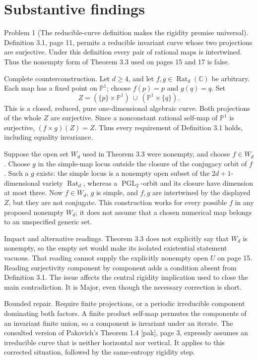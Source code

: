 \documentclass[10pt]{article}
\begin{document}
\section*{Substantive findings}
Problem 1 (The reducible-curve definition makes the rigidity premise universal).  Definition 3.1, page 11, permits a reducible invariant curve whose two projections are surjective. Under this definition every pair of rational maps is intertwined. Thus the nonempty form of Theorem 3.3 used on pages 15 and 17 is false.\par
Complete counterconstruction. Let \(d\geq4\), and let \(f,g\in\operatorname{Rat}_d(\mathbb C)\) be arbitrary. Each map has a fixed point on \(\mathbb P^1\); choose \(f(p)=p\) and \(g(q)=q\). Set \[Z=(\{p\}\times\mathbb P^1)\ \cup\ (\mathbb P^1\times\{q\}).\] This is a closed, reduced, pure one-dimensional algebraic curve. Both projections of the whole \(Z\) are surjective. Since a nonconstant rational self-map of \(\mathbb P^1\) is surjective, \((f\times g)(Z)=Z\). Thus every requirement of Definition 3.1 holds, including equality invariance.\par
Suppose the open set \(W_d\) used in Theorem 3.3 were nonempty, and choose \(f\in W_d\). Choose \(g\) in the simple-map locus outside the closure of the conjugacy orbit of \(f\). Such a \(g\) exists: the simple locus is a nonempty open subset of the \(2d+1\)-dimensional variety \(\operatorname{Rat}_d\), whereas a \(\operatorname{PGL}_2\)-orbit and its closure have dimension at most three. Now \(f\in W_d\), \(g\) is simple, and \(f,g\) are intertwined by the displayed \(Z\), but they are not conjugate. This construction works for every possible \(f\) in any proposed nonempty \(W_d\); it does not assume that a chosen numerical map belongs to an unspecified generic set.\par
Impact and alternative readings. Theorem 3.3 does not explicitly say that \(W_d\) is nonempty, so the empty set would make its isolated existential statement vacuous. That reading cannot supply the explicitly nonempty open \(U\) on page 15. Reading surjectivity component by component adds a condition absent from Definition 3.1. The issue affects the central rigidity implication used to close the main contradiction. It is Major, even though the necessary correction is short.\par
Bounded repair. Require finite projections, or a periodic irreducible component dominating both factors. A finite product self-map permutes the components of an invariant finite union, so a component is invariant under an iterate. The consulted version of Pakovich’s Theorem 1.4 [pak], page 3, expressly assumes an irreducible curve that is neither horizontal nor vertical. It applies to this corrected situation, followed by the same-entropy rigidity step.\par
\end{document}
